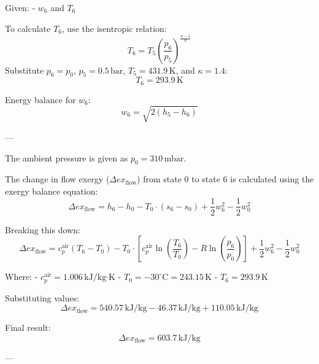 Given:  
- \( w_6 \) and \( T_6 \)  

To calculate \( T_6 \), use the isentropic relation:  
\[
T_6 = T_5 \left( \frac{p_6}{p_5} \right)^{\frac{\kappa - 1}{\kappa}}
\]  
Substitute \( p_6 = p_0 \), \( p_5 = 0.5 \, \text{bar} \), \( T_5 = 431.9 \, \text{K} \), and \( \kappa = 1.4 \):  
\[
T_6 = 293.9 \, \text{K}
\]  

Energy balance for \( w_6 \):  
\[
w_6 = \sqrt{2 \left( h_5 - h_6 \right)}
\]  

---

The ambient pressure is given as \( p_0 = 310 \, \text{mbar} \).  

The change in flow exergy (\( \Delta ex_{\text{flow}} \)) from state 0 to state 6 is calculated using the exergy balance equation:  
\[
\Delta ex_{\text{flow}} = h_6 - h_0 - T_0 \cdot (s_6 - s_0) + \frac{1}{2} w_6^2 - \frac{1}{2} w_0^2
\]  

Breaking this down:  
\[
\Delta ex_{\text{flow}} = c_p^{\text{air}} (T_6 - T_0) - T_0 \cdot \left[ c_p^{\text{air}} \ln\left(\frac{T_6}{T_0}\right) - R \ln\left(\frac{p_6}{p_0}\right) \right] + \frac{1}{2} w_6^2 - \frac{1}{2} w_0^2
\]  

Where:  
- \( c_p^{\text{air}} = 1.006 \, \text{kJ/kg·K} \)  
- \( T_0 = -30^\circ\text{C} = 243.15 \, \text{K} \)  
- \( T_6 = 293.9 \, \text{K} \)  

Substituting values:  
\[
\Delta ex_{\text{flow}} = 540.57 \, \text{kJ/kg} - 46.37 \, \text{kJ/kg} + 110.05 \, \text{kJ/kg}
\]  

Final result:  
\[
\Delta ex_{\text{flow}} = 603.7 \, \text{kJ/kg}
\]  

---